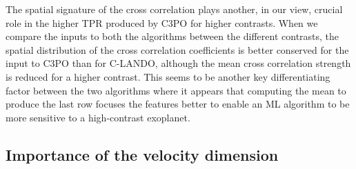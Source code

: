 \documentclass{aa}
\begin{document}
The spatial signature of the cross correlation plays another, in our view, crucial role in the higher TPR produced by C3PO for higher contrasts.
When we compare the inputs to both the algorithms between the different contrasts, the spatial distribution of the cross correlation coefficients is better conserved for the input to C3PO than for C-LANDO, although the mean cross correlation strength is reduced for a higher contrast.
This seems to be another key differentiating factor between the two algorithms where it appears that computing the mean to produce the last row focuses the features better to enable an ML algorithm to be more sensitive to a high-contrast exoplanet.

\subsection{Importance of the velocity dimension}
\end{document}
